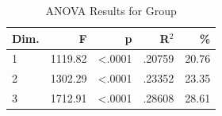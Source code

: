 \begin{table}[H]
  \centering
  \caption{ANOVA Results for Group}
  \label{tab:anova_group}
  \begin{tabular}{l r r r r}
    Dim. & F & p & R$^2$ & \% \\
    \hline
    1 & 1119.82 & <.0001 & .20759 & 20.76 \\
    2 & 1302.29 & <.0001 & .23352 & 23.35 \\
    3 & 1712.91 & <.0001 & .28608 & 28.61 \\
  \end{tabular}
\end{table}
